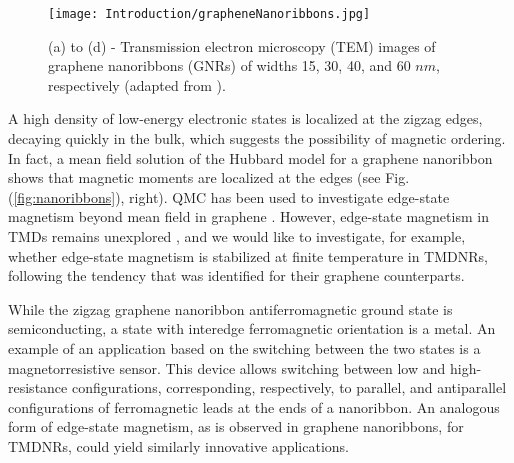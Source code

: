 \begin{figure}[H]
\vspace{-0.5cm}
\centering
\texttt{[image: Introduction/grapheneNanoribbons.jpg]}
\caption[(TEM) images of graphene nanoribbons.]{(a) to (d) - Transmission electron microscopy (TEM) images of graphene nanoribbons (GNRs) of widths 15, 30, 40, and 60 $nm$, respectively (adapted from \cite{mohanty_nanotomy-based_2012}).}
\label{fig:graphNano}
\end{figure}
   
A high density of low-energy electronic states is localized at the zigzag edges, decaying quickly in the bulk, which suggests the possibility of magnetic ordering.
In fact, a mean field solution of the Hubbard model for a graphene nanoribbon shows that magnetic moments are localized at the edges \cite{yazyev_emergence_2010} (see Fig.(\ref{fig:nanoribbons}), right).
QMC has been used to investigate edge-state magnetism beyond mean field in graphene \cite{feldner_dynamical_2011, golor_quantum_2013, cheng_strain-induced_2015, raczkowski_interplay_2017, yang_strain-tuning_2017}.
However, edge-state magnetism in \acp{TMD} remains unexplored \cite{davelou_nanoribbon_2017}, and we would like to investigate, for example, whether edge-state magnetism is stabilized at finite temperature in \acp{TMDNR}, following the tendency that was identified for their graphene counterparts.

While the zigzag graphene nanoribbon antiferromagnetic ground state is semiconducting, a state with interedge ferromagnetic orientation is a metal.
An example of an application based on the switching between the two states is a magnetorresistive sensor.
This device allows switching between low and high-resistance configurations, corresponding, respectively, to parallel, and antiparallel configurations of ferromagnetic leads at the ends of a nanoribbon.
An analogous form of edge-state magnetism, as is observed in graphene nanoribbons, for \acp{TMDNR}, could yield similarly innovative applications.

